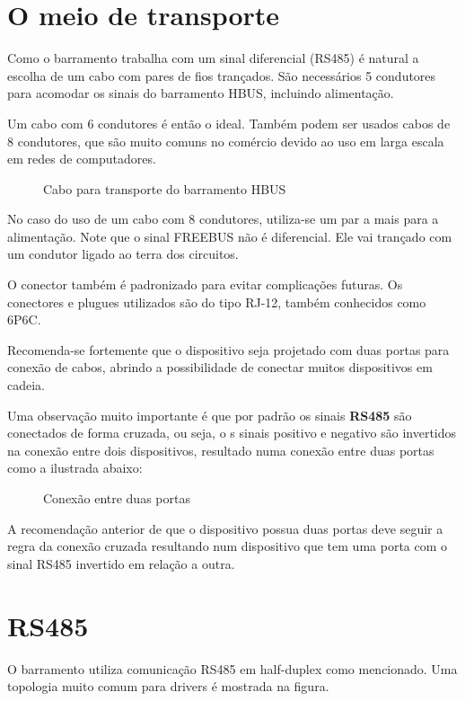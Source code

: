 \documentclass[11pt]{report}
\begin{document}
\section{O meio de transporte}

Como o barramento trabalha com um sinal diferencial (RS485) é natural a escolha de um cabo com pares de fios trançados. São necessários 5 condutores para acomodar os sinais do barramento HBUS, incluindo alimentação.

Um cabo com 6 condutores é então o ideal. Também podem ser usados cabos de 8 condutores, que são muito comuns no comércio devido ao uso em larga escala em redes de computadores.

\begin{figure}[H]
\centering

\caption{Cabo para transporte do barramento HBUS}
\end{figure}

No caso do uso de um cabo com 8 condutores, utiliza-se um par a mais para a alimentação. Note que o sinal FREEBUS não é diferencial. Ele vai trançado com um condutor ligado ao terra dos circuitos.

O conector também é padronizado para evitar complicações futuras. Os conectores e plugues utilizados são do tipo RJ-12, também conhecidos como 6P6C.

Recomenda-se fortemente que o dispositivo seja projetado com duas portas para conexão de cabos, abrindo a possibilidade de conectar muitos dispositivos em cadeia.

Uma observação muito importante é que por padrão os sinais \textbf{RS485} são conectados de forma cruzada, ou seja, o s sinais positivo e negativo são invertidos na conexão entre dois dispositivos, resultado numa conexão entre duas portas como a ilustrada abaixo:

\begin{figure}[H]
\centering

\caption{Conexão entre duas portas}
\end{figure}

A recomendação anterior de que o dispositivo possua duas portas deve seguir a regra da conexão cruzada resultando num dispositivo que tem uma porta com o sinal RS485 invertido em relação a outra.

\section{RS485}

O barramento utiliza comunicação RS485 em half-duplex como mencionado. Uma topologia muito comum para drivers é mostrada na figura.
\end{document}

